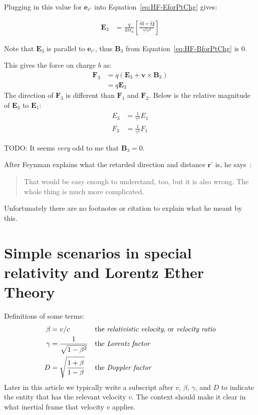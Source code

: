 \documentclass[a4paper]{article}
\theoremstyle{plain}
\theoremstyle{definition}
\newcommand{\ihat}{\textbf{i}}
\newcommand{\jhat}{\textbf{j}}
\newcommand{\vect}[1]{\textbf{#1}}
\begin{document}
Plugging in this value for $\vect{e}_{r'}$ into
Equation~\eqref{eq:HF-EforPtChg} gives:

\begin{align*}
\vect{E}_3 & = \frac{q}{4 \pi \epsilon_0}
             \left[
               \frac{\frac{1}{\gamma} \ihat + \frac{v}{c} \jhat}{\gamma^2 r^2}
             \right]
\end{align*}

Note that $\vect{E}_3$ is parallel to $\vect{e}_{r'}$, thus
$\vect{B}_3$ from Equation~\eqref{eq:HF-BforPtChg} is 0.

This gives the force on charge $b$ as:
\begin{align*}
\vect{F}_3
  & = q (\vect{E}_3 + \vect{v} \times \vect{B}_3) \\
  & = q \vect{E}_3
\end{align*}
The direction of $\vect{F}_3$ is different than $\vect{F}_1$ and $\vect{F}_2$.
Below is the relative magnitude of $\vect{E}_3$ to $\vect{E}_1$:
\begin{align*}
E_3 & = \frac{1}{\gamma^2} E_1 \\
F_3 & = \frac{1}{\gamma^2} F_1
\end{align*}

TODO: It seems {\em very} odd to me that $\vect{B}_3 = 0$.

After Feynman explains what the retarded direction and distance
$\vect{r'}$ is, he says~\cite{FeynmanLecturesVolICh28}:
\begin{quote}
That would be easy enough to understand, too, but it is also
wrong.  The whole thing is much more complicated.
\end{quote}
Unfortunately there are no footnotes or citation to explain what he
meant by this.


\section{Simple scenarios in special relativity and Lorentz Ether Theory}
\label{sec:sr}

Definitions of some terms:
\begin{align}
  \beta & = v / c \label{defn:betaB} & & \text{the {\em relativistic velocity}, or {\em velocity ratio}} \\
  \gamma & = \frac{1}{\sqrt{1 - \beta^2}} & & \text{the {\em Lorentz factor}} \label{defn:LorentzFactor} \\
  D & = \sqrt{ \frac{1 + \beta}{1 - \beta} } & & \text{the {\em Doppler factor}} \label{defn:DopplerFactor}
\end{align}
Later in this article we typically write a subscript after $v$,
$\beta$, $\gamma$, and $D$ to indicate the entity that has the
relevant velocity $v$.  The context should make it clear in what
inertial frame that velocity $v$ applies.
\end{document}
